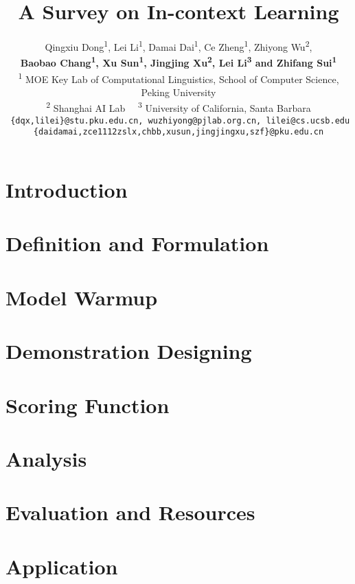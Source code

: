 \documentclass[11pt,a4paper]{article}
\title{A Survey on In-context Learning}
\author{
Qingxiu Dong\textsuperscript{\rm1}, 
Lei Li\textsuperscript{\rm1},
Damai Dai\textsuperscript{\rm1}, 
Ce Zheng\textsuperscript{\rm1},
Zhiyong Wu\textsuperscript{\rm2},\\
\textbf{
Baobao Chang\textsuperscript{\rm1},
Xu Sun\textsuperscript{\rm1},
Jingjing Xu\textsuperscript{\rm2}, 
Lei Li\textsuperscript{\rm3}
and Zhifang Sui\textsuperscript{\rm1}}  \\
\textsuperscript{\rm 1} MOE Key Lab of Computational Linguistics, School of Computer Science, Peking University \\
  \textsuperscript{\rm 2} Shanghai AI Lab \ \ \textsuperscript{\rm 3} University of California, Santa Barbara \\
  \texttt{ \{dqx,lilei\}@stu.pku.edu.cn,  
  wuzhiyong@pjlab.org.cn, lilei@cs.ucsb.edu }
  \\ \texttt{\{daidamai,zce1112zslx,chbb,xusun,jingjingxu,szf\}@pku.edu.cn}
}
\date{}
\begin{document}
\maketitle

\begin{abstract}

\end{abstract}

\section{Introduction}
\label{sec:intro}


\section{Definition and Formulation}
\label{sec:formulation}


\section{Model Warmup}
\label{sec:warmup}


\section{Demonstration Designing}
\label{sec:prompt_tuning}
\label{sec:demo}


\section{Scoring Function}
\label{sec:scoring}


\section{Analysis}
\label{sec:analysis}


\section{Evaluation and Resources}
\label{sec:evaluation}




\section{Application}
\label{sec:application}

\end{document}
